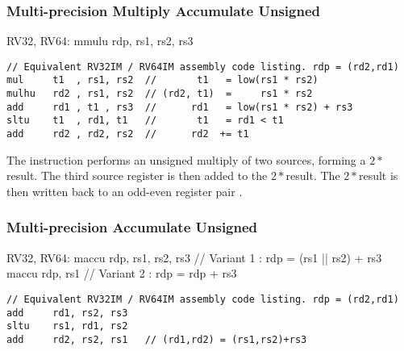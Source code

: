 
\subsubsection{Multi-precision Multiply Accumulate Unsigned}

\begin{cryptoisa}
RV32, RV64:
    mmulu   rdp, rs1, rs2, rs3
\end{cryptoisa}

\begin{lstlisting}[]
// Equivalent RV32IM / RV64IM assembly code listing. rdp = (rd2,rd1)
mul     t1  , rs1, rs2  //       t1   = low(rs1 * rs2)
mulhu   rd2 , rs1, rs2  // (rd2, t1)  =     rs1 * rs2
add     rd1 , t1 , rs3  //      rd1   = low(rs1 * rs2) + rs3
sltu    t1  , rd1, t1   //       t1   = rd1 < t1
add     rd2 , rd2, rs2  //      rd2  += t1
\end{lstlisting}

The  instruction performs an unsigned multiply
of two \XLEN sources, forming a $2*$\XLEN result.
The third \XLEN source register is then added to the $2*$\XLEN result.
The $2*$\XLEN result is then written back to an odd-even register
pair \rdp.


\subsubsection{Multi-precision Accumulate Unsigned}

\begin{cryptoisa}
RV32, RV64:
    maccu   rdp, rs1, rs2, rs3  // Variant 1 : rdp = (rs1 || rs2) + rs3
    maccu   rdp, rs1            // Variant 2 : rdp =  rdp         + rs3
\end{cryptoisa}

\begin{lstlisting}[]
// Equivalent RV32IM / RV64IM assembly code listing. rdp = (rd2,rd1)
add     rd1, rs2, rs3
sltu    rs1, rd1, rs2
add     rd2, rs2, rs1   // (rd1,rd2) = (rs1,rs2)+rs3
\end{lstlisting}

